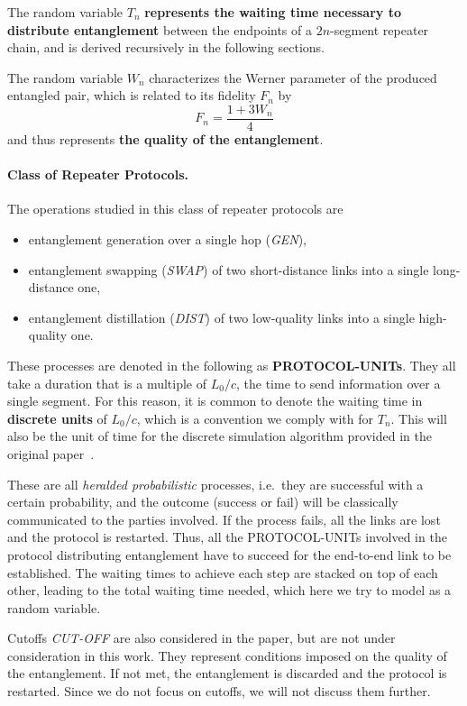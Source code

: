 \documentclass{masterthesis}
\begin{document}
The random variable $T_n$ \textbf{represents the waiting time necessary to distribute entanglement} between the endpoints of a $2n$-segment repeater chain, and is derived recursively in the following sections.

The random variable $W_n$ characterizes the Werner parameter of the produced entangled pair, which is related to its fidelity $F_n$ by
\begin{equation}
    F_n = \frac{1 + 3 W_n}{4}
\end{equation}
and thus represents \textbf{the quality of the entanglement}.

\paragraph{Class of Repeater Protocols.}

The operations studied in this class of repeater protocols are
\begin{itemize}
    \item entanglement generation over a single hop (\textit{GEN}),
    \item entanglement swapping (\textit{SWAP}) of two short-distance links into a single long-distance one,
    \item entanglement distillation (\textit{DIST}) of two low-quality links into a single high-quality one.
\end{itemize}
These processes are denoted in the following as \textbf{PROTOCOL-UNITs}. They all take a duration that is a multiple of ${L_0}/{c}$, the time to send information over a single segment. For this reason, it is common to denote the waiting time in \textbf{discrete units} of ${L_0}/{c}$, which is a convention we comply with for $T_n$. 
This will also be the unit of time for the discrete simulation algorithm provided in the original paper~\cite{Li_2021}.

These are all \textit{heralded probabilistic} processes, i.e.\ they are successful with a certain probability, and the outcome (success or fail) will be classically communicated to the parties involved. If the process fails, all the links are lost and the protocol is restarted. Thus, all the PROTOCOL-UNITs involved in the protocol distributing entanglement have to succeed for the end-to-end link to be established. The waiting times to achieve each step are stacked on top of each other, leading to the total waiting time needed, which here we try to model as a random variable.

Cutoffs \textit{CUT-OFF} are also considered in the paper, but are not under consideration in this work.
They represent conditions imposed on the quality of the entanglement. If not met, the entanglement is discarded and the protocol is restarted.
Since we do not focus on cutoffs, we will not discuss them further.
\end{document}
